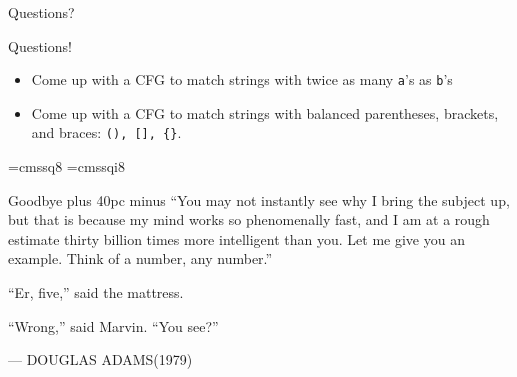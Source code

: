 \documentclass[aspectratio=169]{beamer}
\begin{document}
\begin{frame}{}
      \begin{center}
    {\color{sigma@mainblue} \LARGE Questions?}
  \end{center}
\end{frame}

\begin{frame}{Questions!}

    \begin{itemize}
        \item Come up with a CFG to match strings with twice as many \texttt{a}'s as \texttt{b}'s
        \item Come up with a CFG to match strings with balanced parentheses, brackets, and braces: \texttt{(), [], \{\}}.
    \end{itemize}
    
\end{frame}

\font\eightss=cmssq8
\font\eightssi=cmssqi8
\newcommand\quoteAuthorDate[3]{\begingroup
  \baselineskip 10pt
  \parfillskip 0pt
  \interlinepenalty 10000 %
  \leftskip 0pt plus 40pc minus \parindent
  \let\rm=\eightss
  \let\sl=\eightssi
  \everypar{\sl}#1\par
  \nobreak\smallskip
  \noindent\rm--- #2\unskip\enspace(#3)\par
  \endgroup}

\begin{frame}{Goodbye}
    \centering
    \quoteAuthorDate{``You may not instantly see why I bring the subject up, but that is because my mind works so phenomenally fast, and I am at a rough estimate thirty billion times more intelligent than you. Let me give you an example. Think of a number, any number.'' \par``Er, five,'' said the mattress.\par``Wrong,'' said Marvin. ``You see?''}{DOUGLAS ADAMS}{1979}
\end{frame}
\end{document}
